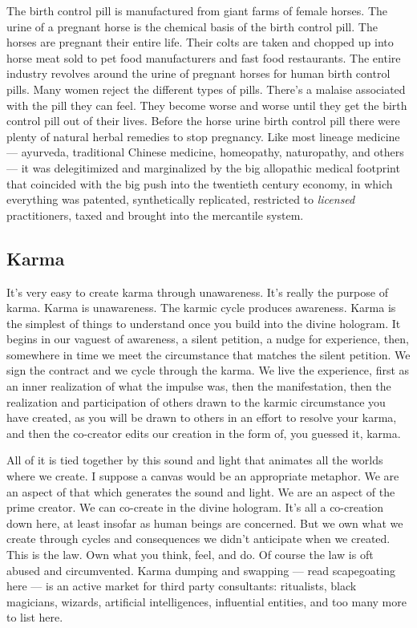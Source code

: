 The birth control pill is manufactured from giant farms of female
horses. The urine of a pregnant horse is the chemical basis of the birth
control pill. The horses are pregnant their entire life. Their colts are
taken and chopped up into horse meat sold to pet food manufacturers and
fast food restaurants. The entire industry revolves around the urine of
pregnant horses for human birth control pills. Many women reject the
different types of pills. There's a malaise associated with the pill
they can feel. They become worse and worse until they get the birth
control pill out of their lives. Before the horse urine birth control
pill there were plenty of natural herbal remedies to stop pregnancy.
Like most lineage medicine --- ayurveda, traditional Chinese medicine,
homeopathy, naturopathy, and others --- it was delegitimized and
marginalized by the big allopathic medical footprint that coincided with
the big push into the twentieth century economy, in which everything was
patented, synthetically replicated, restricted to \emph{licensed}
practitioners, taxed and brought into the mercantile system.

\subsection{Karma}\label{karma}

It's very easy to create karma through unawareness. It's really the
purpose of karma. Karma is unawareness. The karmic cycle produces
awareness. Karma is the simplest of things to understand once you build
into the divine hologram. It begins in our vaguest of awareness, a
silent petition, a nudge for experience, then, somewhere in time we meet
the circumstance that matches the silent petition. We sign the contract
and we cycle through the karma. We live the experience, first as an
inner realization of what the impulse was, then the manifestation, then
the realization and participation of others drawn to the karmic
circumstance you have created, as you will be drawn to others in an
effort to resolve your karma, and then the co-creator edits our creation
in the form of, you guessed it, karma.

All of it is tied together by this sound and light that animates all the
worlds where we create. I suppose a canvas would be an appropriate
metaphor. We are an aspect of that which generates the sound and light.
We are an aspect of the prime creator. We can co-create in the divine
hologram. It's all a co-creation down here, at least insofar as human
beings are concerned. But we own what we create through cycles and
consequences we didn't anticipate when we created. This is the law. Own
what you think, feel, and do. Of course the law is oft abused and
circumvented. Karma dumping and swapping --- read scapegoating here ---
is an active market for third party consultants: ritualists, black
magicians, wizards, artificial intelligences, influential entities, and
too many more to list here.


